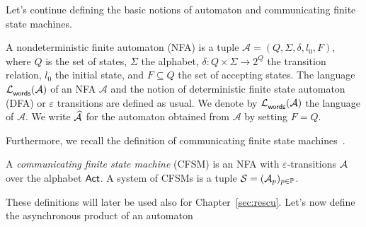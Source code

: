Let's continue defining the basic notions of
automaton and communicating finite state machines.
\begin{definition}[NFA]
    A nondeterministic finite automaton (NFA) is a tuple 
    $\mathcal A = (Q, \Sigma, \delta, l_0, F)$, where $Q$ is the set of states, 
    $\Sigma$ the alphabet, $\delta : Q \times \Sigma \to 2^Q$ the transition relation, 
    $l_0$ the initial state, and $F \subseteq Q$ the set of accepting states. 
    The language $\mathcal{L}_{\mathsf{words}}^{}(\mathcal A)$ of an NFA $\mathcal A$ and the notion of deterministic
    finite state automaton (DFA) or $\varepsilon$ transitions are defined as usual.
    We denote by $\mathcal{L}_{\mathsf{words}}^{}(\mathcal A)$ the language of $\mathcal A$. 
    We write $\widehat{\mathcal A}{}$ for the automaton obtained from $\mathcal A$ by setting $F=Q$.
\end{definition}

Furthermore, we recall the definition of communicating finite state machines~\cite{BrandZafiropulo}.

\begin{definition}[CFSM] \label{def:cfsm}
    A \emph{communicating finite state machine} (CFSM) is an NFA with 
    $\varepsilon$-transitions $\mathcal{A}$ over the alphabet $\mathsf{Act}$.  
    A system of CFSMs is a tuple $\mathcal{S} = (\mathcal{A}_p)_{p \in \mathbb{P}}$.
\end{definition}

These definitions will later be used also for Chapter~\ref{sec:rescu}.
Let's now define the asynchronous product of an automaton

